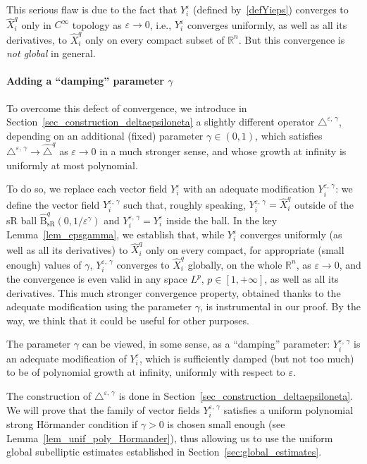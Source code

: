 \documentclass[10pt]{amsart}
\theoremstyle{definition}\newtheorem{defi}[theo]{Definition}\newtheorem{rema}[theo]{Remark}\newtheorem{exam}[theo]{Example}\newtheorem{exem}[theo]{Example}\newtheorem{nota}[theo]{Notation}
\newcommand*\R{\mathbb{R}}
\newcommand{\hatBsR}{\widehat{\mathrm{B}}_{\mathrm{sR}}}
\begin{document}
This serious flaw is due to the fact that $Y_i^\varepsilon$ (defined by~\eqref{defYieps}) converges to $\widehat{X}_i^{q}$ only in $C^\infty$ topology as $\varepsilon\rightarrow 0$, i.e., $Y_i^\varepsilon$ converges uniformly, as well as all its derivatives, to $\widehat{X}_i^{q}$ only on every compact subset of $\R^n$. But this convergence is \emph{not global} in general.

\paragraph{Adding a ``damping'' parameter $\gamma$}
To overcome this defect of convergence, we introduce in Section~\ref{sec_construction_deltaepsiloneta} a slightly different operator $\triangle^{\varepsilon,\,\gamma}$, depending on an additional (fixed) parameter $\gamma\in(0,1)$, which satisfies $\triangle^{\varepsilon,\,\gamma} \rightarrow \widehat{\triangle}^{q}$ as $\varepsilon\rightarrow 0$ in a much stronger sense, and whose growth at infinity is uniformly at most polynomial.

To do so, we replace each vector field $Y_i^\varepsilon$ with an adequate modification $Y_i^{\varepsilon,\,\gamma}$: we define the vector field $Y_i^{\varepsilon,\,\gamma}$ such that, roughly speaking, $Y_i^{\varepsilon,\,\gamma} = \widehat{X}^{q}_i$ outside of the sR ball $\hatBsR^{q}(0,1/\varepsilon^\gamma)$ and $Y_i^{\varepsilon,\,\gamma} = Y_i^\varepsilon$ inside the ball. In the key Lemma~\ref{lem_epsgamma}, we establish that, while $Y_i^\varepsilon$ converges uniformly (as well as all its derivatives) to $\widehat{X}_i^{q}$ only on every compact, for appropriate (small enough) values of $\gamma$, $Y_i^{\varepsilon,\,\gamma}$ converges to $\widehat{X}_i^{q}$ globally, on the whole $\R^n$, as $\varepsilon\rightarrow 0$, and the convergence is even valid in any space $L^p$, $p\in[1,+\infty]$, as well as all its derivatives. This much stronger convergence property, obtained thanks to the adequate modification using the parameter $\gamma$, is instrumental in our proof. By the way, we think that it could be useful for other purposes.

The parameter $\gamma$ can be viewed, in some sense, as a ``damping'' parameter: $Y_i^{\varepsilon,\,\gamma}$ is an adequate modification of $Y_i^\varepsilon$, which is sufficiently damped (but not too much) to be of polynomial growth at infinity, uniformly with respect to $\varepsilon$.

The construction of $\triangle^{\varepsilon,\,\gamma}$ is done in Section~\ref{sec_construction_deltaepsiloneta}. We will prove that the family of vector fields $Y_i^{\varepsilon,\,\gamma}$ satisfies a uniform polynomial strong H\"ormander condition if $\gamma>0$ is chosen small enough (see Lemma~\ref{lem_unif_poly_Hormander}), thus allowing us to use the uniform global subelliptic estimates established in Section~\ref{sec:global_estimates}.
\end{document}

